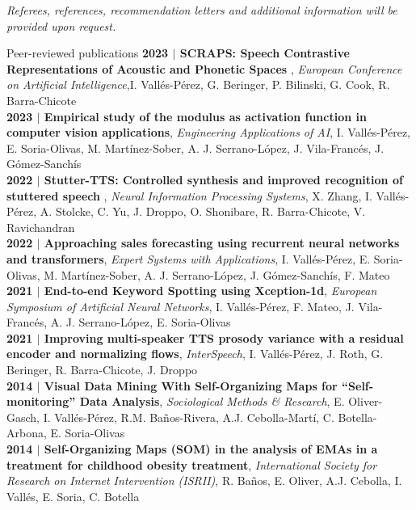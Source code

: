 \documentclass{resume} %
\begin{document}
\begin{flushright}
	\small{\textit{Referees, references, recommendation letters and additional information will be provided upon request.}}
\end{flushright}
\newpage
\begin{rSection}{Peer-reviewed publications}
{\textbf{{2023} $|$ SCRAPS: Speech Contrastive Representations of Acoustic and Phonetic Spaces }, \textit{European Conference on Artificial Intelligence},I. Vallés-Pérez, G. Beringer, P. Bilinski, G. Cook, R. Barra-Chicote}\\
{\textbf{{2023} $|$ Empirical study of the modulus as activation function in computer vision applications}, \textit{Engineering Applications of AI}, I. Vallés-Pérez, E. Soria-Olivas, M. Martínez-Sober, A. J. Serrano-López, J. Vila-Francés, J. Gómez-Sanchís}\\
{\textbf{{2022} $|$ Stutter-TTS: Controlled synthesis and improved recognition of stuttered speech }, \textit{Neural Information Processing Systems}, X. Zhang, I. Vallés-Pérez, A. Stolcke, C. Yu, J. Droppo, O. Shonibare, R. Barra-Chicote, V. Ravichandran}\\
{\textbf{{2022} $|$ Approaching sales forecasting using recurrent neural networks and transformers}, \textit{Expert Systems with Applications}, I. Vallés-Pérez, E. Soria-Olivas, M. Martínez-Sober, A. J. Serrano-López, J. Gómez-Sanchís, F. Mateo}\\
{\textbf{{2021} $|$ End-to-end Keyword Spotting using Xception-1d}, \textit{European Symposium of Artificial Neural Networks}, I. Vallés-Pérez, F. Mateo, J. Vila-Francés, A. J. Serrano-López, E. Soria-Olivas}\\
{\textbf{{2021} $|$ Improving multi-speaker TTS prosody variance with a residual encoder and normalizing flows}, \textit{InterSpeech}, I. Vallés-Pérez, J. Roth, G. Beringer, R. Barra-Chicote, J. Droppo}\\
{\textbf{{2014} $|$ Visual Data Mining With Self-Organizing Maps for ``Self-monitoring'' Data Analysis}, \textit{Sociological Methods \& Research}, E. Oliver-Gasch, I. Vallés-Pérez, R.M. Baños-Rivera, A.J. Cebolla-Martí, C. Botella-Arbona, E. Soria-Olivas}\\
{\textbf{{2014} $|$ Self-Organizing Maps (SOM) in the analysis of EMAs in a treatment for childhood obesity treatment}, \textit{International Society for Research on Internet Intervention (ISRII)}, R. Baños, E. Oliver, A.J. Cebolla, I. Vallés, E. Soria, C. Botella}
\end{rSection}
\end{document}
